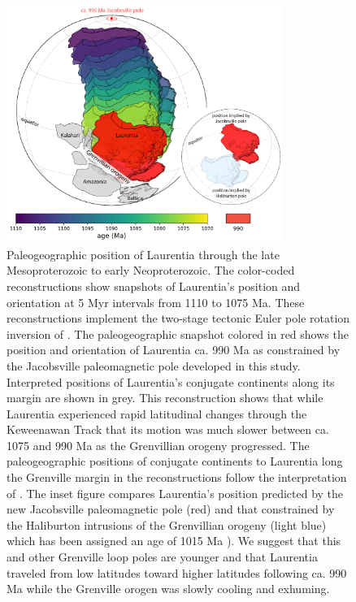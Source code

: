 \begin{figure}[h!]
\centering
\includegraphics[width=0.8\textwidth]{figure/Zhang2024a/Jacobsville_paleogeography.pdf}
\caption[Paleogeographic position of Laurentia through the late Mesoproterozoic to early Neoproterozoic]{Paleogeographic position of Laurentia through the late Mesoproterozoic to early Neoproterozoic. The color-coded reconstructions show snapshots of Laurentia's position and orientation at 5 Myr intervals from 1110 to 1075 Ma. These reconstructions implement the two-stage tectonic Euler pole rotation inversion of \cite{Swanson-Hysell2019a}. The paleogeographic snapshot colored in red shows the position and orientation of Laurentia ca. 990 Ma as constrained by the Jacobsville paleomagnetic pole developed in this study. Interpreted positions of Laurentia's conjugate continents along its margin are shown in grey. This reconstruction shows that while Laurentia experienced rapid latitudinal changes through the Keweenawan Track that its motion was much slower between ca. 1075 and 990 Ma as the Grenvillian orogeny progressed. The paleogeographic positions of conjugate continents to Laurentia long the Grenville margin in the reconstructions follow the interpretation of \cite{Swanson-Hysell2023a}. The inset figure compares Laurentia's position predicted by the new Jacobsville paleomagnetic pole (red) and that constrained by the Haliburton intrusions of the Grenvillian orogeny (light blue) which has been assigned an age of 1015 Ma \citep{Warnock2000a}). We suggest that this and other Grenville loop poles are younger and that Laurentia traveled from low latitudes toward higher latitudes following ca. 990 Ma while the Grenville orogen was slowly cooling and exhuming.}
\label{fig:Jacobsville_paleogeography}
\end{figure}

